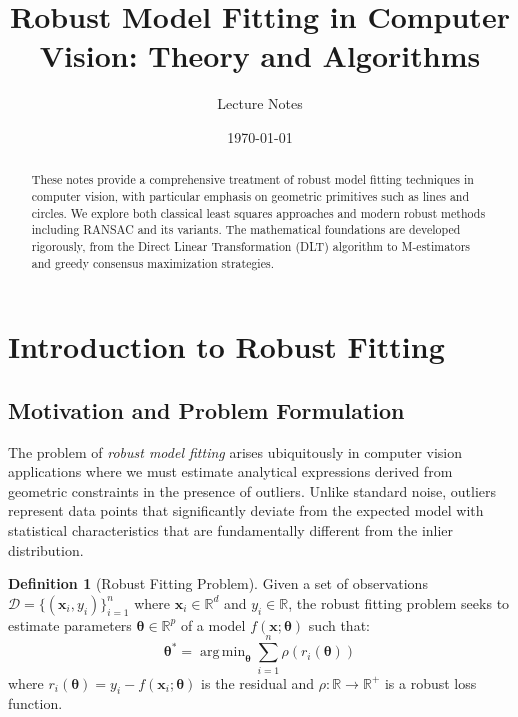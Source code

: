 \documentclass[12pt]{article}
\title{Robust Model Fitting in Computer Vision: Theory and Algorithms}
\author{Lecture Notes}
\date{\today}
\DeclareMathOperator{\argmin}{arg\,min}
\renewcommand{\vec}[1]{\mathbf{#1}}
\newcommand{\R}{\mathbb{R}}
\theoremstyle{definition}
\newtheorem{definition}{Definition}[section]
\begin{document}
\maketitle

\begin{abstract}
    These notes provide a comprehensive treatment of robust model fitting techniques in computer vision, with particular emphasis on geometric primitives such as lines and circles. We explore both classical least squares approaches and modern robust methods including RANSAC and its variants. The mathematical foundations are developed rigorously, from the Direct Linear Transformation (DLT) algorithm to M-estimators and greedy consensus maximization strategies.
\end{abstract}

\tableofcontents
\newpage

\section{Introduction to Robust Fitting}

\subsection{Motivation and Problem Formulation}

The problem of \textit{robust model fitting} arises ubiquitously in computer vision applications where we must estimate analytical expressions derived from geometric constraints in the presence of outliers. Unlike standard noise, outliers represent data points that significantly deviate from the expected model with statistical characteristics that are fundamentally different from the inlier distribution.

\begin{definition}[Robust Fitting Problem]
    Given a set of observations $\mathcal{D} = \{(\vec{x}_i, y_i)\}_{i=1}^n$ where $\vec{x}_i \in \R^d$ and $y_i \in \R$, the robust fitting problem seeks to estimate parameters $\vec{\theta} \in \R^p$ of a model $f(\vec{x}; \vec{\theta})$ such that:
    \begin{equation}
        \vec{\theta}^* = \argmin_{\vec{\theta}} \sum_{i=1}^n \rho(r_i(\vec{\theta}))
    \end{equation}
    where $r_i(\vec{\theta}) = y_i - f(\vec{x}_i; \vec{\theta})$ is the residual and $\rho: \R \to \R^+$ is a robust loss function.
\end{definition}
\end{document}
